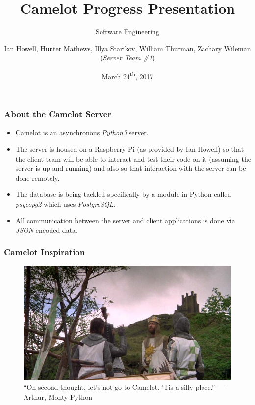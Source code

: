 \documentclass{beamer}
\title{Camelot Progress Presentation}
\subtitle{Software Engineering}
\author{Ian Howell, Hunter Mathews, Illya Starikov, William Thurman, Zachary Wileman (\textit{Server Team \#1})}
\date{March 24\textsuperscript{th}, 2017}
\institute{Missouri University of Science and Technology}
\begin{document}
\maketitle


\begin{frame}
    \frametitle{About the Camelot Server}
    \begin{itemize}
        \item Camelot is an asynchronous \textit{Python3} server.
        \item The server is housed on a Raspberry Pi (as provided by Ian Howell) so that the client team will be able to interact and test their code on it (assuming the server is up and running) and also so that interaction with the server can be done remotely.
        \item The database is being tackled specifically by a module in Python called \textit{psycopg2} which uses \textit{PostgreSQL}.
        \item All communication between the server and client applications is done via \textit{JSON} encoded data.
    \end{itemize}
\end{frame}


\begin{frame}
    \frametitle{Camelot Inspiration}

    \begin{figure}
        \centering
        \includegraphics[width=\textwidth]{images/camelot}
        \caption{``On second thought, let's not go to Camelot. 'Tis a silly place.'' — Arthur, Monty Python}
        \label{fig:camelot}
    \end{figure}
\end{frame}
\end{document}
